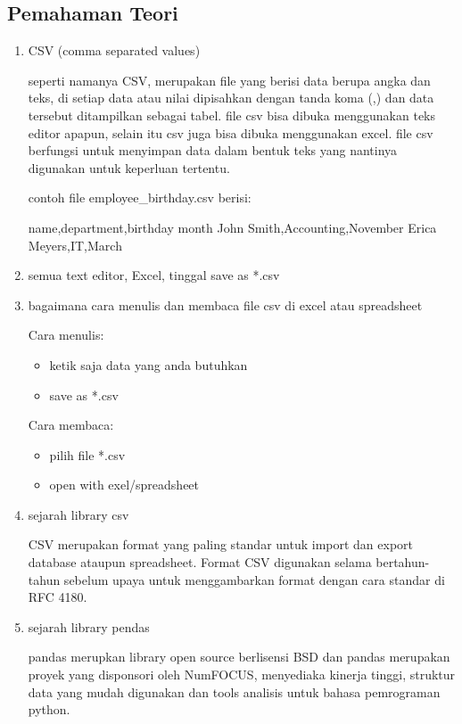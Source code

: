 \subsection{Pemahaman Teori}
\begin{enumerate}
\item CSV (comma separated values)

seperti namanya CSV, merupakan file yang berisi data berupa angka dan teks, di setiap data atau nilai dipisahkan dengan tanda koma (,) dan data tersebut ditampilkan sebagai tabel. file csv bisa dibuka menggunakan teks editor apapun, selain itu csv juga bisa dibuka menggunakan excel. file csv berfungsi untuk menyimpan data dalam bentuk teks yang nantinya digunakan untuk keperluan tertentu.

contoh file employee_birthday.csv berisi:

name,department,birthday month
John Smith,Accounting,November
Erica Meyers,IT,March


\item semua text editor, Excel, tinggal save as *.csv

\item bagaimana cara menulis dan membaca file csv di excel atau spreadsheet

Cara menulis:
\begin{itemize}
	\item ketik saja data yang anda butuhkan
	\item save as *.csv
\end{itemize}

Cara membaca:
\begin{itemize}
	\item pilih file *.csv
	\item open with exel/spreadsheet
\end{itemize}

\item  sejarah library csv

CSV merupakan format yang paling standar untuk import dan export database ataupun spreadsheet. Format CSV digunakan selama bertahun-tahun sebelum upaya untuk menggambarkan format dengan cara standar di RFC 4180. 

\item sejarah library pendas

pandas merupkan library open source berlisensi BSD dan pandas merupakan proyek yang disponsori oleh NumFOCUS, menyediaka kinerja tinggi, struktur data yang mudah digunakan dan tools analisis untuk bahasa pemrograman python.  


\end{enumerate}
